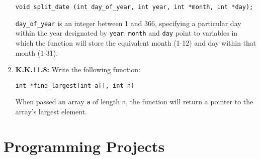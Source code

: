 \documentclass[12pt]{article}
\begin{document}
\begin{enumerate}[1.]
    \bigskip

    \texttt{void split\_date (int day\_of\_year, int year, int *month, int *day);}

    \bigskip

    \texttt{day\_of\_year} is an integer between 1 and 366, specifying a particular day within
    the year designated by \texttt{year}. \texttt{month} and \texttt{day} point to variables in which the
    function will store the equivalent month (1-12) and day within that month
    (1-31).

    \item \textbf{K.K.11.8:} Write the following function:

    \bigskip

    \texttt{int *find\_largest(int a[], int n)}

    \bigskip

    When passed an array \texttt{a} of length \texttt{n}, the function will return a pointer to
    the array's largest element.
\end{enumerate}

\section{Programming Projects}
\end{document}
